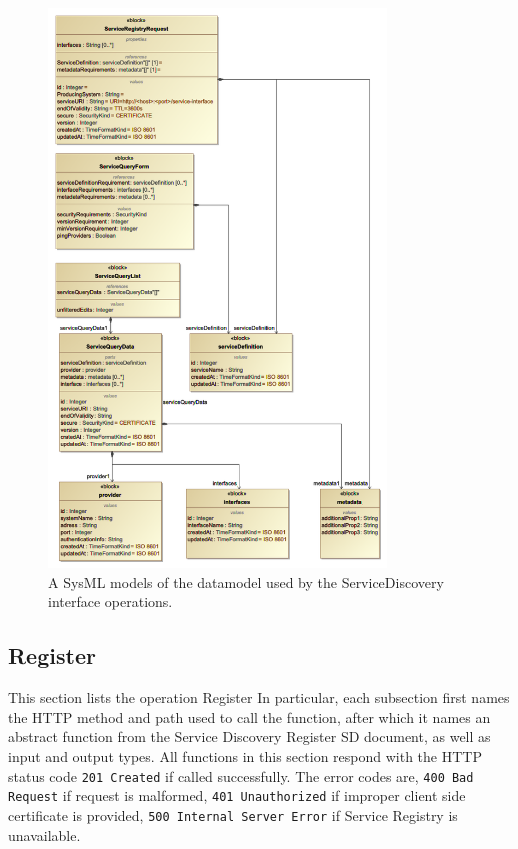 \documentclass[a4paper]{arrowhead}
\begin{document}
\begin{figure}[ht!]
  \centering
  \includegraphics[width=0.8\textwidth]{figures/ServiceDiscovery-datamodels}
  \caption{A SysML models of the datamodel used by the
    ServiceDiscovery interface operations. }
  \label{fig:ServiceDiscovery-datamodels}
\end{figure}



\subsection{Register}
This section lists the operation Register
In particular, each subsection first names the HTTP method and path used to call the function, after which it names an abstract function from the Service Discovery Register SD document, as well as input and output types.
All functions in this section respond with the HTTP status code \texttt{201 Created} if called successfully. The error codes are, \texttt{400 Bad Request} if request is malformed, \texttt{401 Unauthorized} if improper client side certificate is provided, \texttt{500 Internal Server Error} if Service Registry is unavailable.
\end{document}
